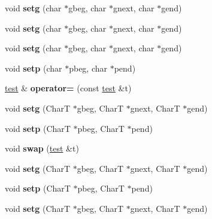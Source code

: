 \begin{DoxyCompactItemize}
void {\bfseries setg} (char $\ast$gbeg, char $\ast$gnext, char $\ast$gend)
\item 
\mbox{\label{structtest_a5dfe7aaf6d7d82da553ba8f0abfbea97}} 
void {\bfseries setg} (char $\ast$gbeg, char $\ast$gnext, char $\ast$gend)
\item 
\mbox{\label{structtest_a5dfe7aaf6d7d82da553ba8f0abfbea97}} 
void {\bfseries setg} (char $\ast$gbeg, char $\ast$gnext, char $\ast$gend)
\item 
\mbox{\label{structtest_a76a41b9e58b089656eaac664c44b35be}} 
void {\bfseries setp} (char $\ast$pbeg, char $\ast$pend)
\item 
\mbox{\label{structtest_aa72e5c178762b9787fbf3c94615f602e}} 
\mbox{\hyperlink{structtest}{test}} \& {\bfseries operator=} (const \mbox{\hyperlink{structtest}{test}} \&t)
\item 
\mbox{\label{structtest_a6e4a956b7c86c4ff3cc80a768ea41215}} 
void {\bfseries setg} (CharT $\ast$gbeg, CharT $\ast$gnext, CharT $\ast$gend)
\item 
\mbox{\label{structtest_a7d348d4742b2946fc916dfd8c7ce9769}} 
void {\bfseries setp} (CharT $\ast$pbeg, CharT $\ast$pend)
\item 
\mbox{\label{structtest_aae4b9ca4190eb9f025de06583f686bc0}} 
void {\bfseries swap} (\mbox{\hyperlink{structtest}{test}} \&t)
\item 
\mbox{\label{structtest_a6e4a956b7c86c4ff3cc80a768ea41215}} 
void {\bfseries setg} (CharT $\ast$gbeg, CharT $\ast$gnext, CharT $\ast$gend)
\item 
\mbox{\label{structtest_a7d348d4742b2946fc916dfd8c7ce9769}} 
void {\bfseries setp} (CharT $\ast$pbeg, CharT $\ast$pend)
\item 
\mbox{\label{structtest_a6e4a956b7c86c4ff3cc80a768ea41215}} 
void {\bfseries setg} (CharT $\ast$gbeg, CharT $\ast$gnext, CharT $\ast$gend)
\item 
\mbox{\label{structtest_a581c2e5cb35ec4bf8a2fa741c404bf8b}} 

\end{DoxyCompactItemize}
